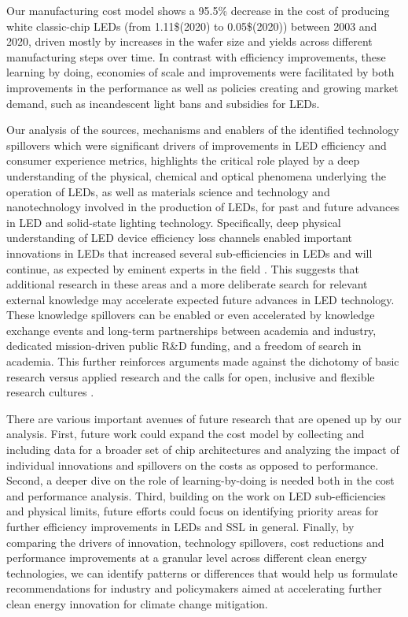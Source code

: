 \documentclass[twoside,twocolumn,9pt]{article}
\begin{document}
Our manufacturing cost model shows a 95.5\% decrease in the cost of producing white classic-chip LEDs (from 1.11\$(2020) to 0.05\$(2020)) between 2003 and 2020, driven mostly by increases in the wafer size and yields across different manufacturing steps over time. In contrast with efficiency improvements, these learning by doing, economies of scale and improvements were facilitated by both improvements in the performance as well as policies creating and growing market demand, such as incandescent light bans and subsidies for LEDs.

Our analysis of the sources, mechanisms and enablers of the identified technology spillovers which were significant drivers of improvements in LED efficiency and consumer experience metrics, highlights the critical role played by a deep understanding of the physical, chemical and optical phenomena underlying the operation of LEDs, as well as materials science and technology and nanotechnology involved in the production of LEDs, for past and future advances in LED and solid-state lighting technology. Specifically, deep physical understanding of LED device efficiency loss channels enabled important innovations in LEDs that increased several sub-efficiencies in LEDs and will continue, as expected by eminent experts in the field \cite{Weisbuch2020}. This suggests that additional research in these areas and a more deliberate search for relevant external knowledge may accelerate expected future advances in LED technology. These knowledge spillovers can be enabled or even accelerated by knowledge exchange events and long-term partnerships between academia and industry, dedicated mission-driven public R\&D funding, and a freedom of search in academia. This further reinforces arguments made against the dichotomy of basic research versus applied research \cite{narayanamurti2016cycles}\cite{narayanamurti2021genesis} and the calls for open, inclusive and flexible research cultures \cite{Stephan2021}.

There are various important avenues of future research that are opened up by our analysis. First, future work could expand the cost model by collecting and including data for a broader set of chip architectures and analyzing the impact of individual innovations and spillovers on the costs as opposed to performance. Second, a deeper dive on the role of learning-by-doing is needed both in the cost and performance analysis. Third, building on the work on LED sub-efficiencies and physical limits, future efforts could focus on identifying priority areas for further efficiency improvements in LEDs and SSL in general. Finally, by comparing the drivers of innovation, technology spillovers, cost reductions and performance improvements at a granular level across different clean energy technologies, we can identify patterns or differences that would help us formulate recommendations for industry and policymakers aimed at accelerating further clean energy innovation for climate change mitigation. 
\end{document}
